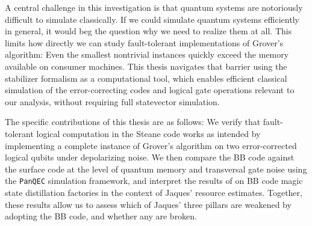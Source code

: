 A central challenge in this investigation is that quantum systems are notoriously difficult to simulate classically. If we could simulate quantum systems efficiently in general, it would beg the question why we need to realize them at all. This limits how directly we can study fault-tolerant implementations of Grover's algorithm: Even the smallest nontrivial instances quickly exceed the memory available on consumer machines. This thesis navigates that barrier using the stabilizer formalism \cite{paritycheckstabilizerwiki,pesah2023_stabilizer_trilogy1} as a computational tool, which enables efficient classical simulation of the error-correcting codes and logical gate operations relevant to our analysis, without requiring full statevector simulation.

The specific contributions of this thesis are as follows: We verify that fault-tolerant logical computation in the Steane code works as intended by implementing a complete instance of Grover's algorithm on two error-corrected logical qubits under depolarizing noise. We then compare the BB code against the surface code at the level of quantum memory and transversal gate noise using the \texttt{PanQEC} simulation framework, and interpret the results of \textcite{Xu_2026} on BB code magic state distillation factories in the context of Jaques' resource estimates. Together, these results allow us to assess which of Jaques' three pillars are weakened by adopting the BB code, and whether any are broken.




